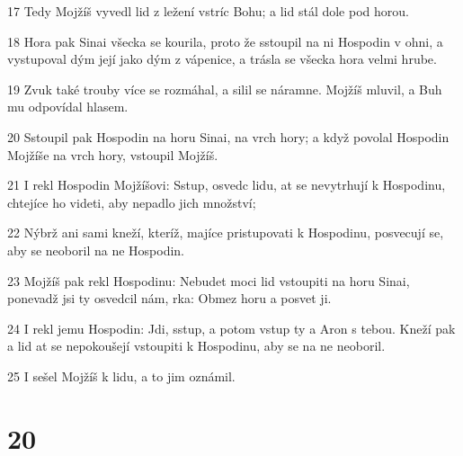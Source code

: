 \par 17 Tedy Mojžíš vyvedl lid z ležení vstríc Bohu; a lid stál dole pod horou.
\par 18 Hora pak Sinai všecka se kourila, proto že sstoupil na ni Hospodin v ohni, a vystupoval dým její jako dým z vápenice, a trásla se všecka hora velmi hrube.
\par 19 Zvuk také trouby více se rozmáhal, a silil se náramne. Mojžíš mluvil, a Buh mu odpovídal hlasem.
\par 20 Sstoupil pak Hospodin na horu Sinai, na vrch hory; a když povolal Hospodin Mojžíše na vrch hory, vstoupil Mojžíš.
\par 21 I rekl Hospodin Mojžíšovi: Sstup, osvedc lidu, at se nevytrhují k Hospodinu, chtejíce ho videti, aby nepadlo jich množství;
\par 22 Nýbrž ani sami kneží, kteríž, majíce pristupovati k Hospodinu, posvecují se, aby se neoboril na ne Hospodin.
\par 23 Mojžíš pak rekl Hospodinu: Nebudet moci lid vstoupiti na horu Sinai, ponevadž jsi ty osvedcil nám, rka: Obmez horu a posvet ji.
\par 24 I rekl jemu Hospodin: Jdi, sstup, a potom vstup ty a Aron s tebou. Kneží pak a lid at se nepokoušejí vstoupiti k Hospodinu, aby se na ne neoboril.
\par 25 I sešel Mojžíš k lidu, a to jim oznámil.

\chapter{20}

